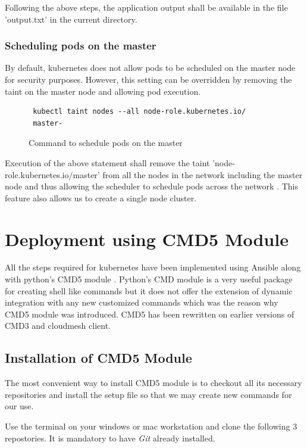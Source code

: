 \documentclass[9pt,twocolumn,twoside]{../../styles/osajnl}
\begin{document}
{\noindent
Following the above steps, the application output shall be available
in the file 'output.txt' in the current directory.


\subsubsection{Scheduling pods on the master}
By default, kubernetes does not allow pods to be
scheduled on the master node for security purposes. However, this
setting can be overridden by removing the taint on the master node and
allowing pod execution.
\begin{figure}[H]
\begin{verbatim}
 kubectl taint nodes --all node-role.kubernetes.io/
 master-
\end{verbatim}
\caption{Command to schedule pods on the master}
\vspace{-4mm}
\label{Command to schedule pods on the master}
\end{figure}

\noindent
Execution of the above statement shall remove the taint
'node-role.kubernetes.io/master' from all the nodes in the network
including the master node and thus allowing the scheduler to schedule
pods across the network \cite{www-kubernetes-kubeadm}. This feature
also allows us to create a single node cluster.

\section{Deployment using CMD5 Module}
All the steps required for kubernetes have been implemented using
Ansible along with python's CMD5 module \cite{www-cmd5}. Python's
CMD module is a very useful package for creating shell like commands
but it does not offer the extension of dynamic integration with any
new customized commands which was the reason why CMD5 module was
introduced. CMD5 has been rewritten on earlier versions of CMD3 and
cloudmesh client.

\subsection{Installation of CMD5 Module}
The most convenient way to install CMD5 module is to checkout all its
necessary repositories and install the setup file so that we may
create new commands for our use.

\noindent
Use the terminal on your windows or mac workstation and clone the
following 3 repostories. It is mandatory to have \emph{Git}
\cite{www-git} already installed.

}
\end{document}
